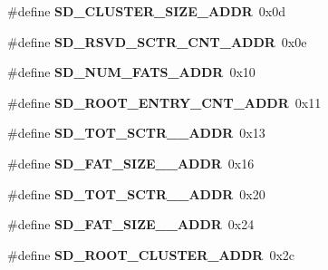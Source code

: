 \begin{DoxyCompactItemize}
\item 
\hypertarget{group__sd__private_ga5f2f6731b0c67a7d06cf865cb4ebd3b0}{\#define {\bfseries \-S\-D\-\_\-\-C\-L\-U\-S\-T\-E\-R\-\_\-\-S\-I\-Z\-E\-\_\-\-A\-D\-D\-R}~0x0d}\label{group__sd__private_ga5f2f6731b0c67a7d06cf865cb4ebd3b0}

\item 
\hypertarget{group__sd__private_ga4ebb154cfa1f917c1c86f93a57993ae0}{\#define {\bfseries \-S\-D\-\_\-\-R\-S\-V\-D\-\_\-\-S\-C\-T\-R\-\_\-\-C\-N\-T\-\_\-\-A\-D\-D\-R}~0x0e}\label{group__sd__private_ga4ebb154cfa1f917c1c86f93a57993ae0}

\item 
\hypertarget{group__sd__private_gafacc0f591110b291441f6b5f6a2a7e23}{\#define {\bfseries \-S\-D\-\_\-\-N\-U\-M\-\_\-\-F\-A\-T\-S\-\_\-\-A\-D\-D\-R}~0x10}\label{group__sd__private_gafacc0f591110b291441f6b5f6a2a7e23}

\item 
\hypertarget{group__sd__private_ga34e013029871a84d46844cec0c0b2982}{\#define {\bfseries \-S\-D\-\_\-\-R\-O\-O\-T\-\_\-\-E\-N\-T\-R\-Y\-\_\-\-C\-N\-T\-\_\-\-A\-D\-D\-R}~0x11}\label{group__sd__private_ga34e013029871a84d46844cec0c0b2982}

\item 
\hypertarget{group__sd__private_ga4a12d7daf06a900e73f91b652a8bea6c}{\#define {\bfseries \-S\-D\-\_\-\-T\-O\-T\-\_\-\-S\-C\-T\-R\-\_\-\_\-\-A\-D\-D\-R}~0x13}\label{group__sd__private_ga4a12d7daf06a900e73f91b652a8bea6c}

\item 
\hypertarget{group__sd__private_ga788f848542b6093cff21fcd68b3dc202}{\#define {\bfseries \-S\-D\-\_\-\-F\-A\-T\-\_\-\-S\-I\-Z\-E\-\_\-\_\-\-A\-D\-D\-R}~0x16}\label{group__sd__private_ga788f848542b6093cff21fcd68b3dc202}

\item 
\hypertarget{group__sd__private_ga17a311070fb42b3f81904056e566cd5b}{\#define {\bfseries \-S\-D\-\_\-\-T\-O\-T\-\_\-\-S\-C\-T\-R\-\_\-\_\-\-A\-D\-D\-R}~0x20}\label{group__sd__private_ga17a311070fb42b3f81904056e566cd5b}

\item 
\hypertarget{group__sd__private_ga96aed3975324eba8e0d3d1a2acc8695a}{\#define {\bfseries \-S\-D\-\_\-\-F\-A\-T\-\_\-\-S\-I\-Z\-E\-\_\-\_\-\-A\-D\-D\-R}~0x24}\label{group__sd__private_ga96aed3975324eba8e0d3d1a2acc8695a}

\item 
\hypertarget{group__sd__private_gafce2aa9a4d72d391968afc7d56f13a99}{\#define {\bfseries \-S\-D\-\_\-\-R\-O\-O\-T\-\_\-\-C\-L\-U\-S\-T\-E\-R\-\_\-\-A\-D\-D\-R}~0x2c}\label{group__sd__private_gafce2aa9a4d72d391968afc7d56f13a99}


\end{DoxyCompactItemize}
